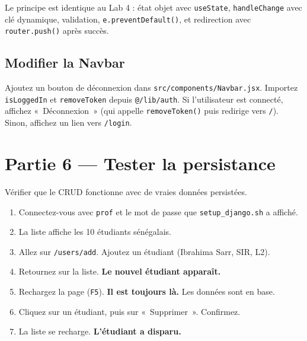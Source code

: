 \documentclass[11pt,a4paper]{article}
\begin{document}
Le principe est identique au Lab 4 : état objet avec \texttt{useState}, \texttt{handleChange} avec clé dynamique, validation, \texttt{e.preventDefault()}, et redirection avec \texttt{router.push()} après succès.

\subsection{Modifier la Navbar}

Ajoutez un bouton de déconnexion dans \texttt{src/components/Navbar.jsx}. Importez \texttt{isLoggedIn} et \texttt{removeToken} depuis \texttt{@/lib/auth}. Si l'utilisateur est connecté, affichez «~Déconnexion~» (qui appelle \texttt{removeToken()} puis redirige vers \texttt{/}). Sinon, affichez un lien vers \texttt{/login}.

\section{Partie 6 --- Tester la persistance}

\begin{objectifbox}
Vérifier que le CRUD fonctionne avec de vraies données persistées.
\end{objectifbox}

\begin{enumerate}[nosep]
\item Connectez-vous avec \texttt{prof} et le mot de passe que \texttt{setup\_django.sh} a affiché.
\item La liste affiche les 10 étudiants sénégalais.
\item Allez sur \texttt{/users/add}. Ajoutez un étudiant (Ibrahima Sarr, SIR, L2).
\item Retournez sur la liste. \textbf{Le nouvel étudiant apparaît.}
\item Rechargez la page (\texttt{F5}). \textbf{Il est toujours là.} Les données sont en base.
\item Cliquez sur un étudiant, puis sur «~Supprimer~». Confirmez.
\item La liste se recharge. \textbf{L'étudiant a disparu.}
\end{enumerate}
\end{document}

